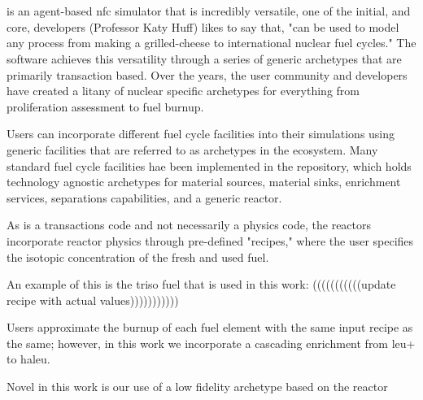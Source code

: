 \section{\cyclus}
\cyclus is an agent-based \gls{nfc} simulator that is incredibly
versatile, one of the initial, and core, developers (Professor Katy Huff)
likes to say that, "\cyclus can be used to model any process from making
a grilled-cheese to international nuclear fuel cycles." The software
achieves this versatility through a series of generic archetypes that are
primarily transaction based. Over the years, the user community and
developers have created a litany of nuclear specific archetypes for
everything from proliferation assessment to fuel burnup.

Users can incorporate different fuel cycle facilities into their \cyclus
simulations using generic facilities that are referred to as archetypes
in the \cyclus ecosystem. Many standard fuel cycle facilities hae been
implemented in the \cycamore repository, which holds technology agnostic
archetypes for material sources, material sinks, enrichment services,
separations capabilities, and a generic reactor.

As \cyclus is a transactions code and not necessarily a physics code,
the reactors incorporate reactor physics through pre-defined "recipes,"
where the user specifies the isotopic concentration of the fresh and
used fuel.

An example of this is the \gls{triso} fuel that is used in this work: (((((((((((update recipe with actual values)))))))))))

Users approximate the burnup of each fuel element with the
same input recipe as the same; however, in this work we incorporate a
cascading enrichment from \gls{leu+} to \gls{haleu}.

Novel in this work is our use of a low fidelity archetype based on the
\cycamore reactor %

